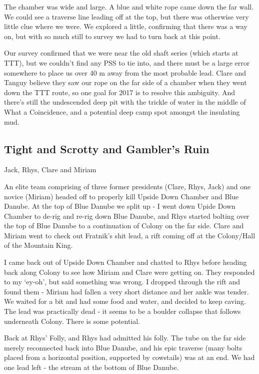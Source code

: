 The chamber was wide and large. A blue and white rope came down the far wall. We could see a traverse line leading off at the top, but there was otherwise very little clue where we were. We explored a little, confirming that there was a way on, but with so much still to survey we had to turn back at this point.
 
Our survey confirmed that we were near the old shaft series (which starts at TTT), but we couldn’t find any PSS to tie into, and there must be a large error somewhere to place us over 40 m away from the most probable lead. Clare and Tanguy believe they saw our rope on the far side of a chamber when they went down the TTT route, so one goal for 2017 is to resolve this ambiguity. And there’s still the undescended deep pit with the trickle of water in the middle of What a Coincidence, and a potential deep camp spot amongst the insulating mud.
 
 

\subsection{Tight and Scrotty and Gambler’s Ruin}
 
Jack, Rhys, Clare and Miriam
 
An elite team comprising of three former presidents (Clare, Rhys, Jack) and one novice (Miriam) headed off to properly kill Upside Down Chamber and Blue Danube. At the top of Blue Danube we split up - I went down Upide Down Chamber to de-rig and re-rig down Blue Danube, and Rhys started bolting over the top of Blue Danube to a continuation of Colony on the far side. Clare and Miriam went to check out Fratnik’s shit lead, a rift coming off at the Colony/Hall of the Mountain King.
 
I came back out of Upside Down Chamber and chatted to Rhys before heading back along Colony to see how Miriam and Clare were getting on. They responded to my ‘ey-oh’, but said something was wrong. I dropped through the rift and found them - Miriam had fallen a very short distance and her ankle was tender. We waited for a bit and had some food and water, and decided to keep caving. The lead was practically dead - it seems to be a boulder collapse that follows underneath Colony. There is some potential.
 
Back at Rhys’ Folly, and Rhys had admitted his folly. The tube on the far side merely reconnected back into Blue Danube, and his epic traverse (many bolts placed from a horizontal position, supported by cowstails) was at an end. We had one lead left - the stream at the bottom of Blue Danube.
 
